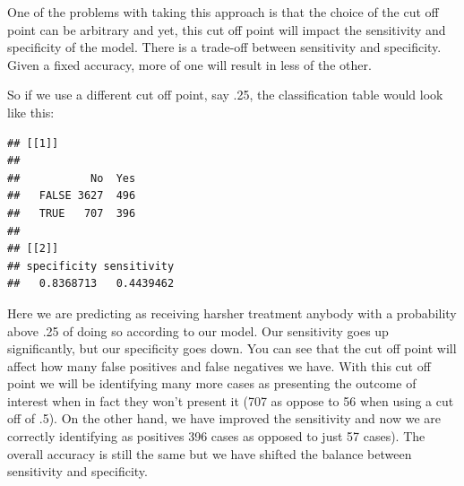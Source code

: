 \documentclass[
]{book}
\newenvironment{Shaded}{\begin{snugshade}}{\end{snugshade}}
\newcommand{\ControlFlowTok}[1]{\textcolor[rgb]{0.13,0.29,0.53}{\textbf{#1}}}
\newcommand{\DecValTok}[1]{\textcolor[rgb]{0.00,0.00,0.81}{#1}}
\newcommand{\FunctionTok}[1]{\textcolor[rgb]{0.00,0.00,0.00}{#1}}
\newcommand{\NormalTok}[1]{#1}
\newcommand{\OtherTok}[1]{\textcolor[rgb]{0.56,0.35,0.01}{#1}}
\newcommand{\SpecialCharTok}[1]{\textcolor[rgb]{0.00,0.00,0.00}{#1}}
\newcommand{\StringTok}[1]{\textcolor[rgb]{0.31,0.60,0.02}{#1}}
\begin{document}
One of the problems with taking this approach is that the choice of the cut off point can be arbitrary and yet, this cut off point will impact the sensitivity and specificity of the model. There is a trade-off between sensitivity and specificity. Given a fixed accuracy, more of one will result in less of the other.

So if we use a different cut off point, say .25, the classification table would look like this:

\begin{Shaded}
\end{Shaded}

\begin{verbatim}
## [[1]]
##        
##           No  Yes
##   FALSE 3627  496
##   TRUE   707  396
## 
## [[2]]
## specificity sensitivity 
##   0.8368713   0.4439462
\end{verbatim}

Here we are predicting as receiving harsher treatment anybody with a probability above .25 of doing so according to our model. Our sensitivity goes up significantly, but our specificity goes down. You can see that the cut off point will affect how many false positives and false negatives we have. With this cut off point we will be identifying many more cases as presenting the outcome of interest when in fact they won't present it (707 as oppose to 56 when using a cut off of .5). On the other hand, we have improved the sensitivity and now we are correctly identifying as positives 396 cases as opposed to just 57 cases). The overall accuracy is still the same but we have shifted the balance between sensitivity and specificity.
\end{document}
